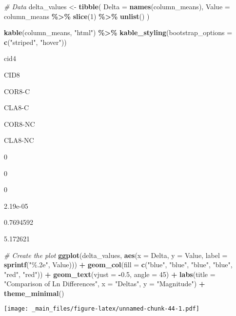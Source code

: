 \documentclass[
]{article}
\newenvironment{Shaded}{\begin{snugshade}}{\end{snugshade}}
\newcommand{\AttributeTok}[1]{\textcolor[rgb]{0.13,0.29,0.53}{#1}}
\newcommand{\CommentTok}[1]{\textcolor[rgb]{0.56,0.35,0.01}{\textit{#1}}}
\newcommand{\DecValTok}[1]{\textcolor[rgb]{0.00,0.00,0.81}{#1}}
\newcommand{\FloatTok}[1]{\textcolor[rgb]{0.00,0.00,0.81}{#1}}
\newcommand{\FunctionTok}[1]{\textcolor[rgb]{0.13,0.29,0.53}{\textbf{#1}}}
\newcommand{\NormalTok}[1]{#1}
\newcommand{\OtherTok}[1]{\textcolor[rgb]{0.56,0.35,0.01}{#1}}
\newcommand{\SpecialCharTok}[1]{\textcolor[rgb]{0.81,0.36,0.00}{\textbf{#1}}}
\newcommand{\StringTok}[1]{\textcolor[rgb]{0.31,0.60,0.02}{#1}}
\begin{document}
\begin{Shaded}
\begin{Highlighting}[]
\CommentTok{\# Data}
\NormalTok{delta\_values }\OtherTok{\textless{}{-}} \FunctionTok{tibble}\NormalTok{(}
  \AttributeTok{Delta =} \FunctionTok{names}\NormalTok{(column\_means),}
  \AttributeTok{Value =}\NormalTok{ column\_means }\SpecialCharTok{\%\textgreater{}\%} \FunctionTok{slice}\NormalTok{(}\DecValTok{1}\NormalTok{) }\SpecialCharTok{\%\textgreater{}\%} \FunctionTok{unlist}\NormalTok{()}
\NormalTok{)}

\FunctionTok{kable}\NormalTok{(column\_means, }\StringTok{"html"}\NormalTok{) }\SpecialCharTok{\%\textgreater{}\%}
  \FunctionTok{kable\_styling}\NormalTok{(}\AttributeTok{bootstrap\_options =} \FunctionTok{c}\NormalTok{(}\StringTok{"striped"}\NormalTok{, }\StringTok{"hover"}\NormalTok{))}
\end{Highlighting}
\end{Shaded}

cid4

CID8

COR8-C

CLA8-C

COR8-NC

CLA8-NC

0

0

0

2.19e-05

0.7694592

5.172621

\begin{Shaded}
\begin{Highlighting}[]
\CommentTok{\# Create the plot}
\FunctionTok{ggplot}\NormalTok{(delta\_values, }\FunctionTok{aes}\NormalTok{(}\AttributeTok{x =}\NormalTok{ Delta, }\AttributeTok{y =}\NormalTok{ Value, }\AttributeTok{label =} \FunctionTok{sprintf}\NormalTok{(}\StringTok{"\%.2e"}\NormalTok{, Value))) }\SpecialCharTok{+}
  \FunctionTok{geom\_col}\NormalTok{(}\AttributeTok{fill =} \FunctionTok{c}\NormalTok{(}\StringTok{"blue"}\NormalTok{, }\StringTok{"blue"}\NormalTok{, }\StringTok{"blue"}\NormalTok{, }\StringTok{"blue"}\NormalTok{, }\StringTok{"red"}\NormalTok{,  }\StringTok{"red"}\NormalTok{)) }\SpecialCharTok{+}
  \FunctionTok{geom\_text}\NormalTok{(}\AttributeTok{vjust =} \SpecialCharTok{{-}}\FloatTok{0.5}\NormalTok{, }\AttributeTok{angle =} \DecValTok{45}\NormalTok{) }\SpecialCharTok{+}
  \FunctionTok{labs}\NormalTok{(}\AttributeTok{title =} \StringTok{"Comparison of Ln Differences"}\NormalTok{, }\AttributeTok{x =} \StringTok{"Deltas"}\NormalTok{, }\AttributeTok{y =} \StringTok{"Magnitude"}\NormalTok{) }\SpecialCharTok{+}
  \FunctionTok{theme\_minimal}\NormalTok{()}
\end{Highlighting}
\end{Shaded}

\texttt{[image: \_main\_files/figure-latex/unnamed-chunk-44-1.pdf]}
\end{document}
